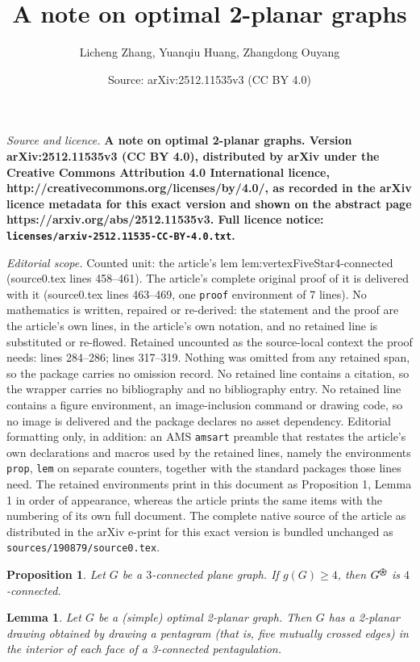 \documentclass[10pt,a4paper]{amsart}
\title{\bfseries A note on optimal 2-planar graphs}
\author{Licheng Zhang, Yuanqiu Huang, Zhangdong Ouyang}
\date{Source: arXiv:2512.11535v3 (CC BY 4.0)}
\newtheorem{prop}{Proposition}
\newtheorem{lem}{Lemma}
\newcommand{\vertexFiveStar}{%
  \begin{tikzpicture}[baseline=-0.5ex, scale=0.1]
    \draw (0,0) circle (1);
    \filldraw (0,0) circle (0.12);
    \foreach \angle in {90,162,234,306,378} {
      \draw (0,0) -- ({cos(\angle)}, {sin(\angle)});
      \filldraw ({cos(\angle)}, {sin(\angle)}) circle (0.08);
    }
  \end{tikzpicture}%
}
\begin{document}
\maketitle

\noindent\emph{Source and licence.} \bfseries A note on optimal 2-planar graphs. Version arXiv:2512.11535v3 (CC BY 4.0), distributed by arXiv under the Creative Commons Attribution 4.0 International licence, http://creativecommons.org/licenses/by/4.0/, as recorded in the arXiv licence metadata for this exact version and shown on the abstract page https://arxiv.org/abs/2512.11535v3. Full licence notice: \texttt{licenses/arxiv-2512.11535-CC-BY-4.0.txt}.\par\smallskip

\noindent\textit{Editorial scope.} Counted unit: the article's lem lem:vertexFiveStar4-connected (source0.tex lines 458--461). The article's complete original proof of it is delivered with it (source0.tex lines 463--469, one \texttt{proof} environment of 7 lines). No mathematics is written, repaired or re-derived: the statement and the proof are the article's own lines, in the article's own notation, and no retained line is substituted or re-flowed.  Retained uncounted as the source-local context the proof needs: lines 284--286; lines 317--319.  Nothing was omitted from any retained span, so the package carries no omission record.  No retained line contains a citation, so the wrapper carries no bibliography and no bibliography entry.  No retained line contains a figure environment, an image-inclusion command or drawing code, so no image is delivered and the package declares no asset dependency.  Editorial formatting only, in addition: an AMS \texttt{amsart} preamble that restates the article's own declarations and macros used by the retained lines, namely the environments \texttt{prop}, \texttt{lem} on separate counters, together with the standard packages those lines need.  The retained environments print in this document as Proposition 1, Lemma 1 in order of appearance, whereas the article prints the same items with the numbering of its own full document.  The complete native source of the article as distributed in the arXiv e-print for this exact version is bundled unchanged as \texttt{sources/190879/source0.tex}.
\begin{prop}\label{prop:star-extension-4conn}
Let \(G\) be a \(3\)-connected plane graph. If \(g(G)\ge 4\), then \(G^{\vertexFiveStar}\) is \(4\)-connected.
\end{prop}

\begin{lem}\label{mainlem}
Let $G$ be a (simple) optimal 2-planar graph. Then $G$ has a 2-planar drawing obtained by drawing  a pentagram (that is, five mutually crossed edges) in the interior of each face of a 3-connected pentagulation.
\end{lem}
\end{document}
